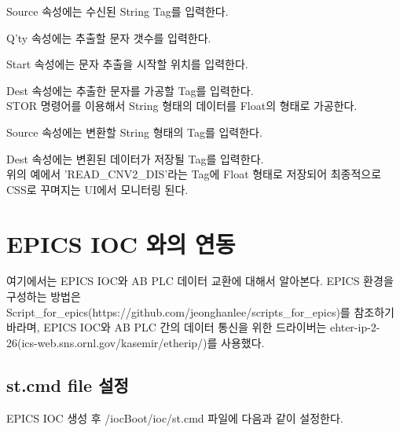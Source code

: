 \documentclass[11pt
  , a4paper
  , article
  , oneside
]{memoir}
\begin{document}
Source 속성에는 수신된 String Tag를 입력한다.\

Q'ty 속성에는 추출할 문자 갯수를 입력한다.\

Start 속성에는 문자 추출을 시작할 위치를 입력한다.\

Dest 속성에는 추출한 문자를 가공할 Tag를 입력한다.\\

STOR 명령어를 이용해서 String 형태의 데이터를 Float의 형태로 가공한다.\

Source 속성에는 변환할 String 형태의 Tag를 입력한다.\

Dest 속성에는 변횐된 데이터가 저장될 Tag를 입력한다.\\

위의 예에서 'READ\_CNV2\_DIS'라는 Tag에 Float 형태로 저장되어 최종적으로 CSS로 꾸며지는 UI에서 모니터링 된다.


\newpage

\chapter{EPICS IOC 와의 연동}
여기에서는 EPICS IOC와 AB PLC 데이터 교환에 대해서 알아본다. EPICS 환경을 구성하는 방법은 Script\_for\_epics(https://github.com/jeonghanlee/scripts\_for\_epics)를 참조하기 바라며, EPICS IOC와 AB PLC 간의 데이터 통신을 위한 드라이버는 ehter-ip-2-26(ics-web.sns.ornl.gov/kasemir/etherip/)를 사용했다. 

\section{st.cmd file 설정}
EPICS IOC 생성 후 /iocBoot/ioc/st.cmd 파일에 다음과 같이 설정한다.
\end{document}

